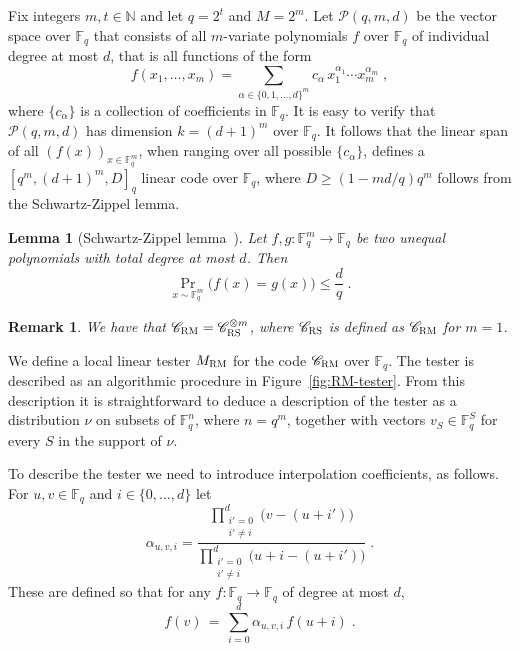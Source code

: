 \documentclass[11pt]{article}
\newtheorem{lemma}[theorem]{Lemma}
\newtheorem{remark}[theorem]{Remark}
\theoremstyle{definition}
\newcommand{\code}{\mathscr{C}}
\newcommand{\N}{\ensuremath{\mathbb{N}}}
\newcommand{\F}{\ensuremath{\mathbb{F}}}
\newcommand{\mP}{\ensuremath{\mathcal{P}}}
\newcommand{\RM}{\ensuremath{\textsc{RM}}}
\newcommand{\RS}{\ensuremath{\textsc{RS}}}
\begin{document}
Fix integers $m,t \in \N$ and let $q=2^t$ and $M = 2^m$. Let $\mP(q,m,d)$ be the vector space over $\F_q$ that consists of all $m$-variate polynomials $f$ over $\F_q$ of individual degree at most $d$, that is all functions of the form
\[
	f(x_1,\ldots,x_m) = \sum_{\alpha \in \{0,1,\ldots,d\}^m} c_\alpha\,
  x_1^{\alpha_1} \cdots x_m^{\alpha_m}\;,
\]
where $\{c_\alpha\}$ is a collection of coefficients in $\F_q$. It is easy to verify that $\mP(q,m,d)$ has dimension $k = (d+1)^m$ over $\F_q$. It follows that the linear span of all $(f(x))_{x\in \F_q^m}$, when ranging over all possible $\{c_\alpha\}$, defines a $[q^m,(d+1)^m,D]_q$ linear code over $\F_q$, where $D\geq (1-md/q)q^m$ follows from the Schwartz-Zippel lemma.

\begin{lemma}[Schwartz-Zippel lemma~\cite{Sch80,Zip79}]
  \label{lem:schwartz-zippel}
  Let $f, g: \F_q^m \to \F_q$ be two unequal polynomials with total degree at most $d$. Then
  \begin{equation*}
    \Pr_{x \sim \F_q^m}\big(f(x) = g(x)\big) \leq \frac{d}{q}\;.
  \end{equation*}
\end{lemma}

\begin{remark}\label{rk:tensor-code}
We have that $\code_\RM = \code_\RS^{\otimes m}$, where $\code_\RS$ is defined as $\code_\RM$ for $m=1$.
\end{remark}


We define a local linear tester $M_{\RM}$ for the code $\code_\RM$ over $\F_q$. The tester is described as an algorithmic procedure in Figure~\ref{fig:RM-tester}. From this description it is straightforward to deduce a description of the tester as a distribution $\nu$ on subsets of $\F_q^n$, where $n=q^m$, together with vectors $v_S\in \F_q^S$ for every $S$ in the support of $\nu$. 

To describe the tester we need to introduce interpolation coefficients, as follows. For $u,v\in \F_q$ and $i\in\{0,\ldots,d\}$ let 
\begin{equation}\label{eq:interp-coeff}
 \alpha_{u,v,i} = \frac{\prod_{\substack{i'=0\\i'\neq i}}^{d} \big(v-(u+i')\big)}{\prod_{\substack{i'=0\\i'\neq i}}^{d} \big(u+i-(u+i')\big)}\;.
\end{equation}
These are defined so that for any $f:\F_q\to\F_q$ of degree at most $d$, 
\[ f(v)\,=\, \sum_{i=0}^{d} \alpha_{u,v,i} \, f(u+i)\;.\]
\end{document}
